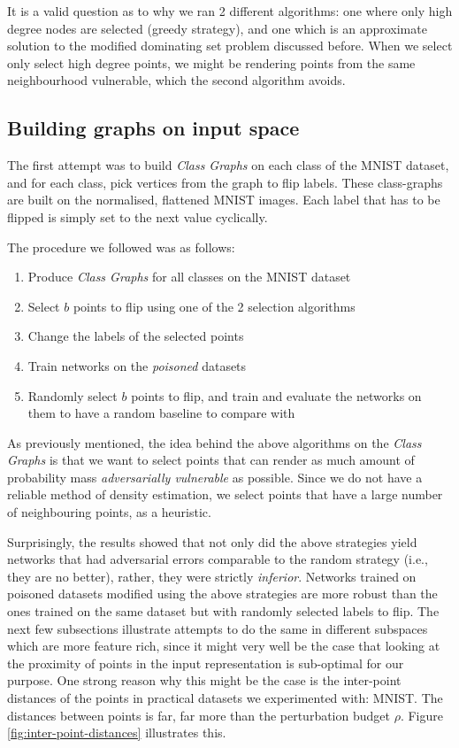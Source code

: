 \documentclass{ociamthesis}
\begin{document}
It is a valid question as to why we ran 2 different algorithms: one where only
high degree nodes are selected (greedy strategy), and one which is an
approximate solution to the modified dominating set problem discussed before.
When we select only select high degree points, we might be rendering points from
the same neighbourhood vulnerable, which the second algorithm avoids.

\subsection{Building graphs on input space}
The first attempt was to build \emph{Class Graphs} on each class of the MNIST
dataset, and for each class, pick vertices from the graph to flip labels. These
class-graphs are built on the normalised, flattened MNIST images. Each label
that has to be flipped is simply set to the next value cyclically.

The procedure we followed was as follows:
\begin{enumerate}
    \item Produce \emph{Class Graphs } for all classes on the MNIST dataset
    \item Select $b$ points to flip using one of the 2 selection algorithms
    \item Change the labels of the selected points
    \item Train networks on the \emph{poisoned} datasets
    \item  Randomly select $b$ points to flip, and train and evaluate the
    networks on them to have a random baseline to compare with
\end{enumerate}

As previously mentioned, the idea behind the above algorithms on the \emph{Class
Graphs} is that we want to select points that can render as much amount of
probability mass \emph{adversarially vulnerable} as possible. Since we do not
have a reliable method of density estimation, we select points that have a large
number of neighbouring points, as a heuristic.


Surprisingly, the results showed that not only did the above strategies yield
networks that had adversarial errors comparable to the random strategy (i.e.,
they are no better), rather, they were strictly \emph{inferior}. Networks
trained on poisoned datasets modified using the above strategies are more robust
than the ones trained on the same dataset but with randomly selected labels to
flip. The next few subsections illustrate attempts to do the same in different
subspaces which are more feature rich, since it might very well be the case that
looking at the proximity of points in the input representation is sub-optimal
for our purpose. One strong reason why this might be the case is the inter-point
distances of the points in practical datasets we experimented with: MNIST. The
distances between points is far, far more than the perturbation budget $\rho$.
Figure \ref{fig:inter-point-distances} illustrates this.
\end{document}

